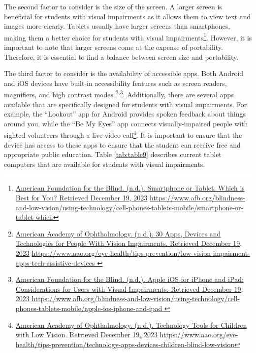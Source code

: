 \documentclass[12pt,letterpaper,twoside,openright]{report}
\newcommand\fnsep{\textsuperscript{,}}
\begin{document}
The second factor to consider is the size of the screen. A larger screen is beneficial for students with visual impairments as it allows them to view text and images more clearly. Tablets usually have larger screens than smartphones, making them a better choice for students with visual impairments\footnote{\raggedright \href{https://www.afb.org/blindness-and-low-vision/using-technology/cell-phones-tablets-mobile/smartphone-or-tablet-which}{American Foundation for the Blind. (n.d.). Smartphone or Tablet: Which is Best for You? Retrieved December 19, 2023} \url{https://www.afb.org/blindness-and-low-vision/using-technology/cell-phones-tablets-mobile/smartphone-or-tablet-which}}. However, it is important to note that larger screens come at the expense of portability. Therefore, it is essential to find a balance between screen size and portability.

The third factor to consider is the availability of accessible apps. Both Android and iOS devices have built-in accessibility features such as screen readers, magnifiers, and high contrast modes \footnote{\raggedright \href{https://www.aao.org/eye-health/tips-prevention/low-vision-impairment-apps-tech-assistive-devices }{American Academy of Ophthalmology. (n.d.). 30 Apps, Devices and Technologies for People With Vision Impairments. Retrieved December 19, 2023} \url{https://www.aao.org/eye-health/tips-prevention/low-vision-impairment-apps-tech-assistive-devices }}\fnsep\footnote{\raggedright \href{https://www.afb.org/blindness-and-low-vision/using-technology/cell-phones-tablets-mobile/apple-ios-iphone-and-ipad }{American Foundation for the Blind. (n.d.). Apple iOS for iPhone and iPad: Considerations for Users with Visual Impairments. Retrieved December 19, 2023} \url{https://www.afb.org/blindness-and-low-vision/using-technology/cell-phones-tablets-mobile/apple-ios-iphone-and-ipad }}. Additionally, there are several apps available that are specifically designed for students with visual impairments. For example, the “Lookout” app for Android provides spoken feedback about things around you, while the “Be My Eyes” app connects visually-impaired people with sighted volunteers through a live video call\footnote{\raggedright \href{https://www.aao.org/eye-health/tips-prevention/technology-apps-devices-children-blind-low-vision}{American Academy of Ophthalmology. (n.d.). Technology Tools for Children with Low Vision. Retrieved December 19, 2023} \url{https://www.aao.org/eye-health/tips-prevention/technology-apps-devices-children-blind-low-vision}}. It is important to ensure that the device has access to these apps to ensure that the student can receive free and appropriate public education.
Table \ref{tab:table9} describes current tablet computers that are available for students with visual impairments.
\end{document}
